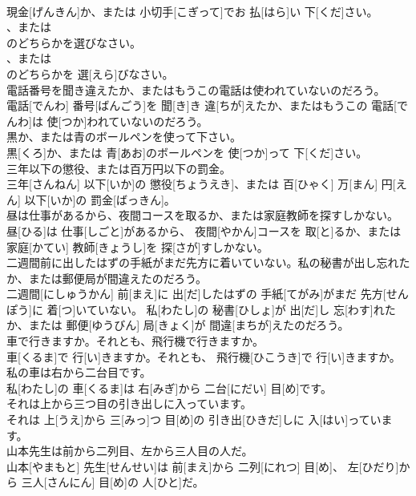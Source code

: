 \documentclass[8pt]{extreport}
\begin{document}
\begin{CJK}{UTF8}{min}
\\	現金[げんきん]か、または 小切手[こぎって]でお 払[はら]い 下[くだ]さい。
\\	、または
\\	のどちらかを選びなさい。	
\\	、または 
\\	のどちらかを 選[えら]びなさい。
\\	電話番号を聞き違えたか、またはもうこの電話は使われていないのだろう。	
\\	電話[でんわ] 番号[ばんごう]を 聞[き]き 違[ちが]えたか、またはもうこの 電話[でんわ]は 使[つか]われていないのだろう。
\\	黒か、または青のボールペンを使って下さい。	
\\	黒[くろ]か、または 青[あお]のボールペンを 使[つか]って 下[くだ]さい。
\\	三年以下の懲役、または百万円以下の罰金。	
\\	三年[さんねん] 以下[いか]の 懲役[ちょうえき]、または 百[ひゃく] 万[まん] 円[えん] 以下[いか]の 罰金[ばっきん]。
\\	昼は仕事があるから、夜間コースを取るか、または家庭教師を探すしかない。	
\\	昼[ひる]は 仕事[しごと]があるから、 夜間[やかん]コースを 取[と]るか、または 家庭[かてい] 教師[きょうし]を 探[さが]すしかない。
\\	二週間前に出したはずの手紙がまだ先方に着いていない。私の秘書が出し忘れたか、または郵便局が間違えたのだろう。	
\\	二週間[にしゅうかん] 前[まえ]に 出[だ]したはずの 手紙[てがみ]がまだ 先方[せんぽう]に 着[つ]いていない。 私[わたし]の 秘書[ひしょ]が 出[だ]し 忘[わす]れたか、または 郵便[ゆうびん] 局[きょく]が 間違[まちが]えたのだろう。
\\	車で行きますか。それとも、飛行機で行きますか。	
\\	車[くるま]で 行[い]きますか。それとも、 飛行機[ひこうき]で 行[い]きますか。
\\	私の車は右から二台目です。	
\\	私[わたし]の 車[くるま]は 右[みぎ]から 二台[にだい] 目[め]です。
\\	それは上から三つ目の引き出しに入っています。	
\\	それは 上[うえ]から 三[みっ]つ 目[め]の 引き出[ひきだ]しに 入[はい]っています。
\\	山本先生は前から二列目、左から三人目の人だ。	
\\	山本[やまもと] 先生[せんせい]は 前[まえ]から 二列[にれつ] 目[め]、 左[ひだり]から 三人[さんにん] 目[め]の 人[ひと]だ。

\end{CJK}
\end{document}
